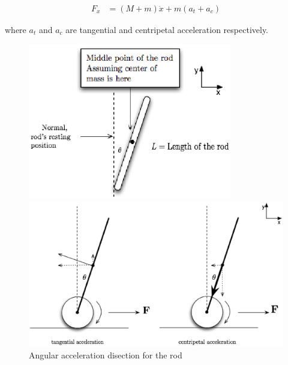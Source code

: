 \documentclass{notes}
\begin{document}
\begin{align*}
  F_x & = (M+m) \ddot{x} + m (a_{t} + a_{c})
\end{align*}

where $a_t$ and $a_c$ are tangential and centripetal acceleration respectively. 

\begin{figure}[!h]
  \begin{center}
    \begin{minipage}[b]{3.5in}
      \centerline{\mbox{\includegraphics[width=3.5in]{pics/rod.eps}}}
    \end{minipage}
    \begin{minipage}[b]{3.5in}
      \centerline{\mbox{\includegraphics[width=4.5 in]{pics/rod_acc.eps}}}
    \end{minipage}
    
  \end{center}
  \caption{Angular acceleration disection for the rod}
  \label{fig:angular_rod}
\end{figure}
\end{document}
